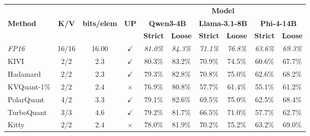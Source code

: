 \documentclass{llmxive}
\providecommand{\others}[1]{\cellcolor{gray!10}#1}
\begin{document}
\begin{table}[t]
\centering
\begin{threeparttable}
\small
\setlength{\tabcolsep}{5pt}
\begin{tabular}{l c c c cc cc cc}
\toprule
& & & & \multicolumn{6}{c}{\textbf{Model}} \\
\cmidrule(lr){5-10}
\textbf{Method} & \textbf{K/V} & \textbf{bits/elem} & \textbf{UP}
& \multicolumn{2}{c}{\textbf{Qwen3-4B}} 
& \multicolumn{2}{c}{\textbf{Llama-3.1-8B}} 
& \multicolumn{2}{c}{\textbf{Phi-4-14B}} \\
\cmidrule(lr){5-6} \cmidrule(lr){7-8} \cmidrule(lr){9-10}
& & & 
& \textbf{Strict} & \textbf{Loose} 
& \textbf{Strict} & \textbf{Loose} 
& \textbf{Strict} & \textbf{Loose} \\
\midrule

\textit{FP16} & 16/16 & 16.00 & $\checkmark$
& \textit{81.0\%} & \textit{84.3\%} 
& \textit{71.1\%} & \textit{76.8\%} 
& \textit{63.6\%} & \textit{69.3\%} \\

\midrule

\others{KIVI} & \others{2/2} & \others{2.3} & \others{$\checkmark$}
& \others{80.3\%} & \others{83.2\%} 
& \others{70.9\%} & \others{74.5\%} 
& \others{60.6\%} & \others{67.7\%} \\

\others{Hadamard} & \others{2/2} & \others{2.3} & \others{$\checkmark$}
& \others{79.3\%} & \others{82.8\%} 
& \others{70.8\%} & \others{75.0\%} 
& \others{62.6\%} & \others{68.2\%} \\

\others{KVQuant-1\%} & \others{2/2} & \others{2.4} & \others{$\times$}
& \others{76.9\%} & \others{80.8\%} 
& \others{57.7\%} & \others{61.4\%} 
& \others{55.1\%} & \others{61.2\%} \\

\others{PolarQuant} & \others{4/2} & \others{3.3} & \others{$\checkmark$}
& \others{79.1\%} & \others{82.6\%} 
& \others{69.5\%} & \others{75.0\%} 
& \others{62.5\%} & \others{68.4\%} \\

\others{TurboQuant\tnote{1}} & \others{3/3} & \others{4.6} & \others{$\checkmark$}
& \others{79.2\%} & \others{81.7\%} 
& \others{66.5\%} & \others{71.0\%} 
& \others{57.7\%} & \others{62.7\%} \\

\others{Kitty} & \others{2/2} & \others{2.4} & \others{$\times$}
& \others{78.0\%} & \others{81.9\%} 
& \others{70.2\%} & \others{75.2\%} 
& \others{63.2\%} & \others{69.0\%} \\


\end{tabular}
\end{threeparttable}
\end{table}
\end{document}

